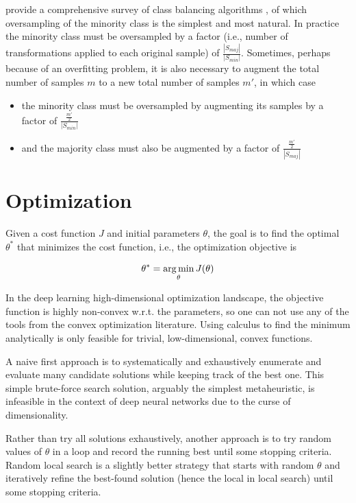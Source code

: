 \citeauthor{haibo2009} provide a comprehensive survey of class balancing algorithms \cite{haibo2009}, of which oversampling of the minority class is the simplest and most natural. In practice the minority class must be oversampled by a factor (i.e., number of transformations applied to each original sample) of $\frac{|S_{maj}|}{|S_{min}|}$. Sometimes, perhaps because of an overfitting problem, it is also necessary to augment the total number of samples $m$ to a new total number of samples $m'$, in which case

\begin{itemize}
    \item the minority class must be oversampled by augmenting its samples  by a factor of $\frac{\frac{m'}{2}}{|S_{min}|}$
    \item and the majority class must also be augmented by a factor of $\frac{\frac{m'}{2}}{|S_{maj}|}$
\end{itemize}

\section{Optimization}

Given a cost function $J$ and initial parameters $\theta$, the goal is to find the optimal $\theta^*$ that minimizes the cost function, i.e., the optimization objective is

$$
\theta^{*} = \operatorname*{arg\,min}_{\theta} J(\theta)
$$

In the deep learning high-dimensional optimization landscape, the objective function is highly non-convex w.r.t. the parameters, so one can not use any of the tools from the convex optimization literature. Using calculus to find the minimum analytically is only feasible for trivial, low-dimensional, convex functions.

A naive first approach is to systematically and exhaustively enumerate and evaluate many candidate solutions while keeping track of the best one. This simple brute-force search solution, arguably the simplest metaheuristic, is infeasible in the context of deep neural networks due to the curse of dimensionality.

Rather than try all solutions exhaustively, another approach is to try random values of $\theta$ in a loop and record the running best until some stopping criteria. Random local search is a slightly better strategy that starts with random $\theta$ and iteratively refine the best-found solution (hence the local in local search) until some stopping criteria.

